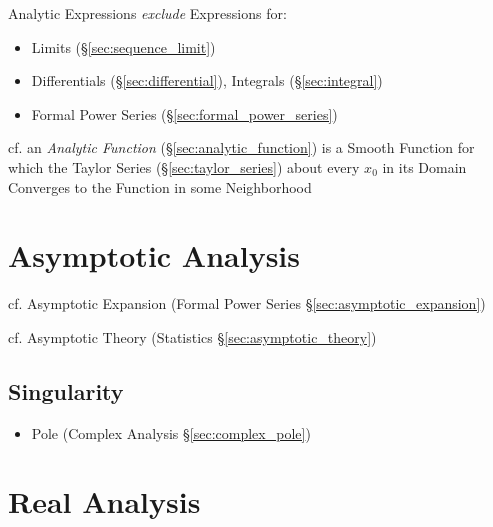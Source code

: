 Analytic Expressions \emph{exclude} Expressions for:
\begin{itemize}
  \item Limits (\S\ref{sec:sequence_limit})
  \item Differentials (\S\ref{sec:differential}), Integrals
    (\S\ref{sec:integral})
  \item Formal Power Series (\S\ref{sec:formal_power_series})
\end{itemize}

\fist cf. an \emph{Analytic Function} (\S\ref{sec:analytic_function}) is a
Smooth Function for which the Taylor Series (\S\ref{sec:taylor_series}) about
every $x_0$ in its Domain Converges to the Function in some Neighborhood



\section{Asymptotic Analysis}\label{sec:asymptotic_analysis}


\fist cf. Asymptotic Expansion (Formal Power Series
\S\ref{sec:asymptotic_expansion})

\fist cf. Asymptotic Theory (Statistics \S\ref{sec:asymptotic_theory})



\subsection{Singularity}\label{sec:singularity}

\begin{itemize}
  \item Pole (Complex Analysis \S\ref{sec:complex_pole})
\end{itemize}



\section{Real Analysis}\label{sec:real_analysis}

